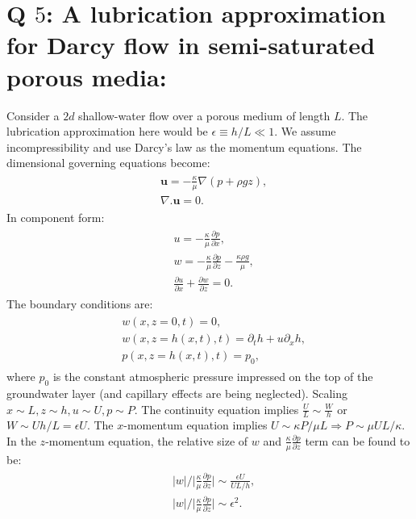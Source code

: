 \documentclass{article}
\begin{document}
\section{Q $5$: A lubrication approximation for Darcy flow in semi-saturated porous media: }
Consider a $2d$ shallow-water flow over a porous medium of length $L$. The lubrication approximation here would be $\epsilon \equiv h/L \ll 1$.  We assume incompressibility and use Darcy's law as the momentum equations. The dimensional governing equations become:
\begin{align}
 \begin{split}
  & \boldsymbol{u} = -\frac{\kappa}{\mu}\nabla(p + \rho g z),\\
  & \nabla.\boldsymbol{u} = 0.
 \end{split}
 \end{align}
%
In component form:
\begin{align}\label{eq:lub_darcy_flow_dim}
 \begin{split}
  & u = -\frac{\kappa}{\mu}\frac{\partial p}{\partial x},\\
  & w = -\frac{\kappa}{\mu}\frac{\partial p}{\partial z} -\frac{\kappa \rho g}{\mu},\\
  & \frac{\partial u}{\partial x} + \frac{\partial w}{\partial z} = 0.
 \end{split}
 \end{align}
%
 The boundary conditions are:
 \begin{align}\label{eq:lub_darcy_flow_bcs_dim}
  \begin{split}
   & w(x, z= 0, t) = 0,\\
   & w(x, z= h(x,t), t) = \partial_{t}h + u \partial_{x}h,\\
   & p(x, z=h(x,t), t) = p_{0},
  \end{split}
 \end{align}
%
where  $p_{0}$ is the constant atmospheric pressure impressed on the top of the groundwater layer (and
capillary effects are being neglected). Scaling $x \sim L, z \sim h, u \sim U, p \sim P$. The continuity equation implies $\frac{U}{L} \sim \frac{W}{h}$ or $W \sim Uh/L = \epsilon U$. The $x$-momentum equation implies $U \sim \kappa P/ \mu L \Rightarrow P \sim \mu U L/\kappa$. 
%
In the $z$-momentum equation, the relative size of $w$ and $ \frac{\kappa}{\mu}\frac{\partial p}{\partial z}$ term can be found to be:
\begin{align}
 \begin{split}
  & |w|\bigg/ \bigg|\frac{\kappa}{\mu}\frac{\partial p}{\partial z}\bigg| \sim \frac{\epsilon U}{UL/h},\\ 
  &|w|\bigg/ \bigg|\frac{\kappa}{\mu}\frac{\partial p}{\partial z}\bigg| \sim \epsilon^{2}.
 \end{split}
\end{align}
\end{document}
